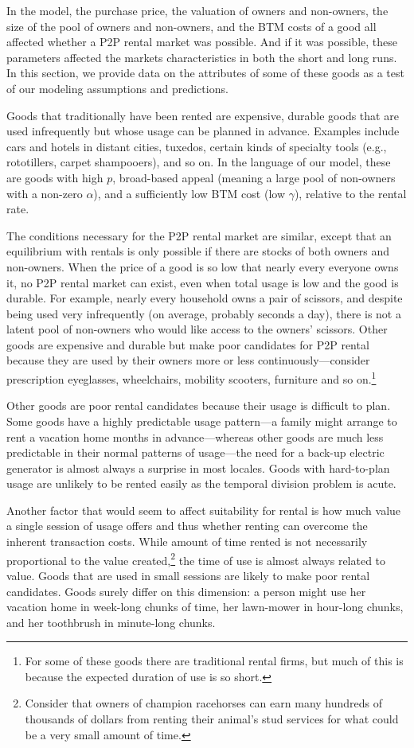 \documentclass[11pt]{article}
\begin{document}
In the model, the purchase price, the valuation of owners and non-owners, the size of the pool of owners and non-owners, and the BTM costs of a good all affected whether a P2P rental market was possible.
And if it was possible, these parameters affected the markets
characteristics in both the short and long runs. 
In this section, we provide data on the attributes of some of these goods as a test of our modeling assumptions and predictions.  

Goods that traditionally have been rented are expensive, durable goods that are used infrequently but whose usage can be planned in advance.
Examples include cars and hotels in distant cities, tuxedos, certain kinds of specialty tools (e.g., rototillers, carpet shampooers), and so on.
In the language of our model, these are goods with high $p$, broad-based appeal (meaning a large pool of non-owners with a non-zero $\alpha$), and a sufficiently low BTM cost (low $\gamma$), relative to the rental rate. 

The conditions necessary for the P2P rental market are similar, except that an equilibrium with rentals is only possible if there are stocks of both owners and non-owners. 
When the price of a good is so low that nearly every everyone owns it, no P2P rental market can exist, even when total usage is low and the good is durable.
For example, nearly every household owns a pair of scissors, and despite being used very infrequently (on average, probably seconds a day), there is not a latent pool of non-owners who would like access to the owners' scissors.  
Other goods are expensive and durable but make poor candidates for P2P rental because they are used by their owners more or less continuously---consider prescription eyeglasses, wheelchairs, mobility scooters, furniture and so on.\footnote{
  For some of these goods there are traditional rental firms, but much of this is because the expected duration of use is so short.  
} 

Other goods are poor rental candidates because their usage is difficult to plan. 
Some goods have a highly predictable usage pattern---a family might arrange to rent a vacation home months in advance---whereas other goods are much less predictable in their normal patterns of usage---the need for a back-up electric generator is almost always a surprise in most locales.  
Goods with hard-to-plan usage are unlikely to be rented easily as the temporal division problem is acute.

Another factor that would seem to affect suitability for rental is how much value a single session of usage offers and thus whether renting can overcome the inherent transaction costs.
While amount of time rented is not necessarily proportional to the value created,\footnote{
  Consider that owners of champion racehorses can earn many hundreds of thousands of dollars from renting their animal's stud services for what could be a very small amount of time.}  
the time of use is almost always related to value.
Goods that are used in small sessions are likely to make poor rental candidates.
Goods surely differ on this dimension: 
a person might use her vacation home in week-long chunks of time, her lawn-mower in hour-long chunks, and her toothbrush in minute-long chunks. 
\end{document}
